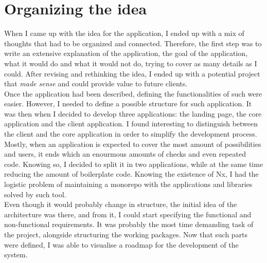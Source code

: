 \documentclass[a4paper, 12pt, oneside]{book}
\begin{document}
\section{Organizing the idea}
When I came up with the idea for the application, I ended up with a mix of thoughts that had to be organized and connected. Therefore, the first step was to write an extensive explanation of the application, the goal of the application, what it would do and what it would not do, trying to cover as many details as I could. After revising and rethinking the idea, I ended up with a potential project that \emph{made sense} and could provide value to future clients.
\\[8pt]
Once the application had been described, defining the functionalities of such were easier. However, I needed to define a possible structure for such application. It was then when I decided to develop three applications: the landing page, the core application and the client application. I found interesting to distinguish between the client and the core application in order to simplify the development process. Mostly, when an application is expected to cover the most amount of possibilities and users, it ends which an enourmous amounts of checks and even repeated code. Knowing so, I decided to split it in two applications, while at the same time reducing the amount of boilerplate code. Knowing the existence of Nx, I had the logistic problem of maintaining a monorepo with the applications and libraries solved by such tool.
\\[8pt]
Even though it would probably change in structure, the initial idea of the architecture was there, and from it, I could start specifying the functional and non-functional requirements. It was probably the most time demanding task of the project, alongside structuring the working packages. Now that such parts were defined, I was able to visualise a roadmap for the development of the system.
\end{document}
